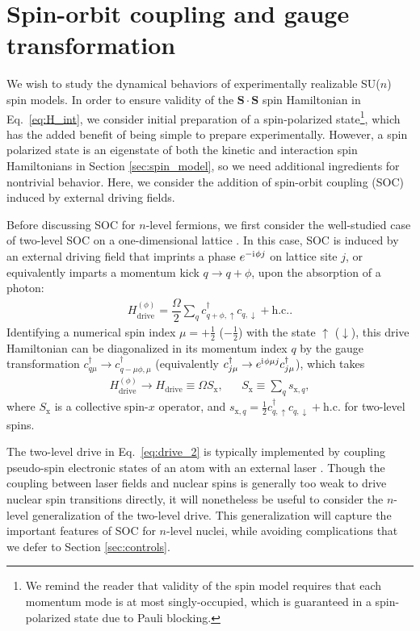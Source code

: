 \documentclass[nofootinbib,twocolumn]{revtex4-2}
\renewcommand{\t}{\text} %
\newcommand{\f}[2]{\dfrac{#1}{#2}} %
\renewcommand{\v}{\bm} %
\renewcommand{\c}{\cdot} %
\renewcommand{\i}{\mathrm{i}\mkern1mu} %
\newcommand{\1}{\mathds{1}}
\newcommand{\up}{\uparrow}
\newcommand{\dn}{\downarrow}
\newcommand{\x}{\text{x}}
\begin{document}
\section{Spin-orbit coupling and gauge transformation}
\label{sec:SOC}

We wish to study the dynamical behaviors of experimentally realizable SU($n$) spin models.
In order to ensure validity of the $\v S\c\v S$ spin Hamiltonian in Eq.~\eqref{eq:H_int}, we consider initial preparation of a spin-polarized state\footnote{We remind the reader that validity of the spin model requires that each momentum mode is at most singly-occupied, which is guaranteed in a spin-polarized state due to Pauli blocking.}, which has the added benefit of being simple to prepare experimentally.
However, a spin polarized state is an eigenstate of both the kinetic and interaction spin Hamiltonians in Section \ref{sec:spin_model}, so we need additional ingredients for nontrivial behavior.
Here, we consider the addition of spin-orbit coupling (SOC) induced by external driving fields.

Before discussing SOC for $n$-level fermions, we first consider the well-studied case of two-level SOC on a one-dimensional lattice \cite{wall2016synthetic, bromley2018dynamics}.
In this case, SOC is induced by an external driving field that imprints a phase $e^{-\i\phi j}$ on lattice site $j$, or equivalently imparts a momentum kick $q\to q+\phi$, upon the absorption of a photon:
\begin{align}
  H_{\t{drive}}^{(\phi)}
  = \f{\Omega}{2} \sum_q c_{q+\phi,\up}^\dag c_{q,\dn} + \t{h.c.}.
  \label{eq:drive_2}
\end{align}
Identifying a numerical spin index $\mu=+\frac12$ ($-\frac12$) with the state $\up$ ($\dn$), this drive Hamiltonian can be diagonalized in its momentum index $q$ by the gauge transformation $c_{q\mu}^\dag\to c_{q-\mu\phi,\mu}^\dag$ (equivalently $c_{j\mu}^\dag\to e^{\i\phi\mu j} c_{j\mu}^\dag$), which takes
\begin{align}
  H_{\t{drive}}^{(\phi)} \to H_{\t{drive}} \equiv \Omega S_\x,
  &&
  S_\x \equiv \sum_q s_{\x,q},
  \label{eq:drive_trans}
\end{align}
where $S_\x$ is a collective spin-$x$ operator, and $s_{\x,q}=\frac12 c_{q,\up}^\dag c_{q,\dn} + \t{h.c.}$ for two-level spins.

The two-level drive in Eq.~\eqref{eq:drive_2} is typically implemented by coupling pseudo-spin electronic states of an atom with an external laser \cite{wall2016synthetic, bromley2018dynamics}.
Though the coupling between laser fields and nuclear spins is generally too weak to drive nuclear spin transitions directly, it will nonetheless be useful to consider the $n$-level generalization of the two-level drive.
This generalization will capture the important features of SOC for $n$-level nuclei, while avoiding complications that we defer to Section \ref{sec:controls}.
\end{document}
